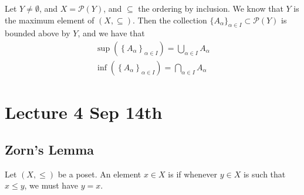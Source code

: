 \documentclass[notoc,notitlepage]{tufte-book}
\begin{document}
\begin{eg}
  Let $Y \neq \emptyset$, and $X = \mathcal{P}(Y)$, and $\subseteq$ the ordering by inclusion. We know that $Y$ is the maximum element of $(X, \subseteq)$. Then the collection $\{ A_\alpha \}_{\alpha \in I} \subset \mathcal{P}(Y)$ is bounded above by $Y$, and we have that
  \begin{gather*}
    \sup \left( \left\{ A_\alpha \right\}_{\alpha \in I} \right) = \bigcup_{\alpha \in I} A_\alpha \\
    \inf \left( \left\{ A_\alpha \right\}_{\alpha \in I} \right) = \bigcap_{\alpha \in I} A_\alpha
  \end{gather*}
\end{eg}



\chapter{Lecture 4 Sep 14th}%
\label{chp:lecture_4_sep_14th}

\section{Zorn's Lemma}%
\label{sec:zorn_s_lemma}

\begin{defn}
\label{defn:maximal_element}
  Let $(X, \leq)$ be a poset. An element $x \in X$ is  if whenever $y \in X$ is such that $x \leq y$, we must have $y = x$.
\end{defn}
\end{document}

